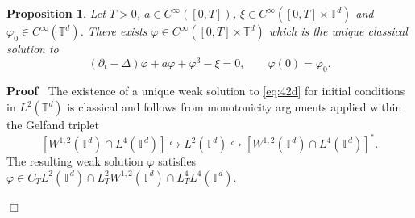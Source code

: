 \documentclass[a4paper,11pt]{article}
\newenvironment{proof}{\noindent\textbf{Proof\ }}{\hspace*{\fill}$\Box$\medskip}
\newtheorem{proposition}[theorem]{Proposition}
\numberwithin{equation}{section}
\newcommand{\Td}{{\mathbb{T}^{d}}}
\newcommand{\8}{\infty}
\begin{document}
\begin{proposition}\label{prop:42d}
Let $T>0$, $a\in C^{\infty}([0,T])$, $\xi\in C^{\infty}([0,T]\times\Td)$ and $\varphi_{0}\in C^{\infty}(\Td)$. There exists $\varphi\in C^{\infty}([0,T]\times \mathbb{T}^{d})$ which is the unique classical solution to
\begin{equation}\label{eq:42d}
(\partial_{t}-\Delta) \varphi +a\varphi + \varphi^3- \xi = 0,\qquad\varphi(0)=\varphi_{0}.
\end{equation}
\end{proposition}

\begin{proof}
The existence of a unique weak solution to \eqref{eq:42d} for initial conditions in $L^{2}(\mathbb{T}^{d})$ is classical and follows from monotonicity arguments applied within the Gelfand triplet $$[W^{1,2}(\mathbb{T}^{d})\cap L^{4}(\mathbb{T}^{d}) ]\hookrightarrow L^{2}(\mathbb{T}^{d})\hookrightarrow [W^{1,2}(\mathbb{T}^{d})\cap L^{4}(\mathbb{T}^{d})]^{*}.$$
The resulting weak solution $\varphi$ satisfies $\varphi\in C_{T}L^{2}(\mathbb{T}^{d})\cap L^{2}_{T}W^{1,2}(\mathbb{T}^{d})\cap L^{4}_{T}L^{4}(\mathbb{T}^{d})$. 




\end{proof}
\end{document}
